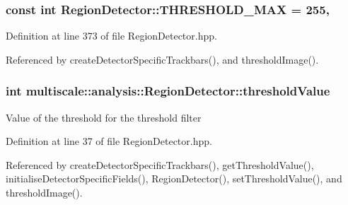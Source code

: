 \hypertarget{classmultiscale_1_1analysis_1_1RegionDetector_a53c6e2b067a8b8c82484cbca34cc3d57}{
\subsubsection[{T\-H\-R\-E\-S\-H\-O\-L\-D\-\_\-\-M\-A\-X}]{\setlength{\rightskip}{0pt plus 5cm}const int Region\-Detector\-::\-T\-H\-R\-E\-S\-H\-O\-L\-D\-\_\-\-M\-A\-X = 255\hspace{0.3cm}{\ttfamily [static]}, {\ttfamily [private]}}}\label{classmultiscale_1_1analysis_1_1RegionDetector_a53c6e2b067a8b8c82484cbca34cc3d57}


Definition at line 373 of file Region\-Detector.\-hpp.



Referenced by create\-Detector\-Specific\-Trackbars(), and threshold\-Image().

\hypertarget{classmultiscale_1_1analysis_1_1RegionDetector_a0f7469d124c0b906d199e00ea5713007}{
\subsubsection[{threshold\-Value}]{\setlength{\rightskip}{0pt plus 5cm}int multiscale\-::analysis\-::\-Region\-Detector\-::threshold\-Value\hspace{0.3cm}{\ttfamily [private]}}}\label{classmultiscale_1_1analysis_1_1RegionDetector_a0f7469d124c0b906d199e00ea5713007}
Value of the threshold for the threshold filter 

Definition at line 37 of file Region\-Detector.\-hpp.



Referenced by create\-Detector\-Specific\-Trackbars(), get\-Threshold\-Value(), initialise\-Detector\-Specific\-Fields(), Region\-Detector(), set\-Threshold\-Value(), and threshold\-Image().

